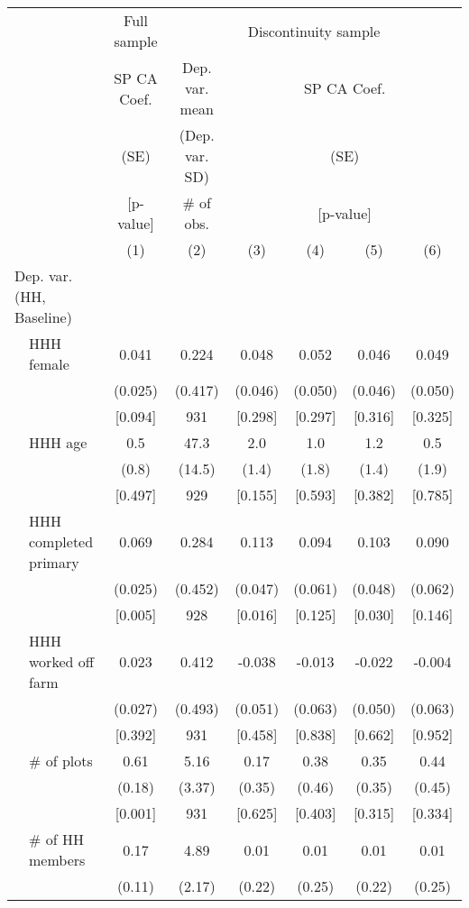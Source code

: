 \begin{tabular}{llcccccc}
\hline \hline
 & & \multicolumn{1}{c}{Full sample} & \multicolumn{5}{c}{Discontinuity sample} \\
\cmidrule(lr){3-3}\cmidrule(lr){4-8}
 & & \multicolumn{1}{c}{SP CA Coef.} & Dep. var. mean & \multicolumn{4}{c}{SP CA Coef.} \\
 & & \multicolumn{1}{c}{(SE)} & (Dep. var. SD) & \multicolumn{4}{c}{(SE)} \\
 & & \multicolumn{1}{c}{[p-value]} & \# of obs. & \multicolumn{4}{c}{[p-value]} \\
\cmidrule(lr){3-3}\cmidrule(lr){5-8}
 & & (1) & (2) & (3) & (4) & (5) & (6) \\
\hline
\multicolumn{2}{l}{Dep. var. (HH, Baseline)} & & & & & & \\
\cmidrule(lr){1-2}
 & HHH female & 0.041 & 0.224 & 0.048 & 0.052 & 0.046 & 0.049 \\
 & & (0.025) & (0.417) & (0.046) & (0.050) & (0.046) & (0.050) \\
 & & [0.094] & 931 & [0.298] & [0.297] & [0.316] & [0.325] \\[0.5em]
 & HHH age & 0.5 & 47.3 & 2.0 & 1.0 & 1.2 & 0.5 \\
 & & (0.8) & (14.5) & (1.4) & (1.8) & (1.4) & (1.9) \\
 & & [0.497] & 929 & [0.155] & [0.593] & [0.382] & [0.785] \\[0.5em]
 & HHH completed primary & 0.069 & 0.284 & 0.113 & 0.094 & 0.103 & 0.090 \\
 & & (0.025) & (0.452) & (0.047) & (0.061) & (0.048) & (0.062) \\
 & & [0.005] & 928 & [0.016] & [0.125] & [0.030] & [0.146] \\[0.5em]
 & HHH worked off farm & 0.023 & 0.412 & -0.038 & -0.013 & -0.022 & -0.004 \\
 & & (0.027) & (0.493) & (0.051) & (0.063) & (0.050) & (0.063) \\
 & & [0.392] & 931 & [0.458] & [0.838] & [0.662] & [0.952] \\[0.5em]
 & \# of plots & 0.61 & 5.16 & 0.17 & 0.38 & 0.35 & 0.44 \\
 & & (0.18) & (3.37) & (0.35) & (0.46) & (0.35) & (0.45) \\
 & & [0.001] & 931 & [0.625] & [0.403] & [0.315] & [0.334] \\[0.5em]
 & \# of HH members & 0.17 & 4.89 & 0.01 & 0.01 & 0.01 & 0.01 \\
 & & (0.11) & (2.17) & (0.22) & (0.25) & (0.22) & (0.25) \\

\end{tabular}
